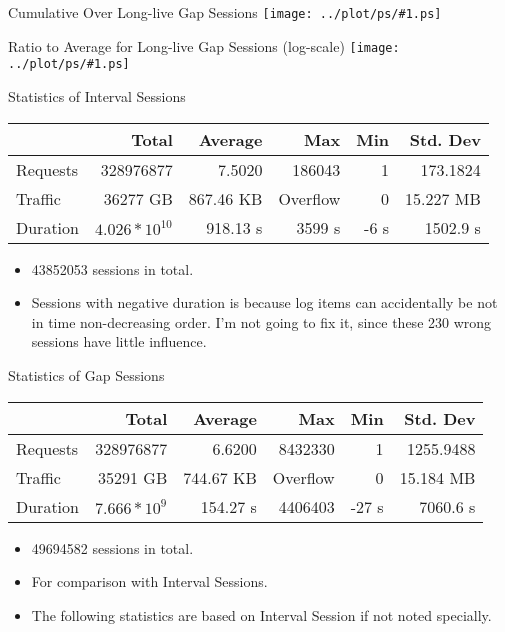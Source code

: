 \documentclass{beamer}
\newcommand\graph[1]{{\texttt{[image: ../plot/ps/\#1.ps]}}}
\begin{document}
\begin{frame}{Cumulative Over Long-live Gap Sessions}
\graph{session-longlive}
\end{frame}

\begin{frame}{Ratio to Average for Long-live Gap Sessions (log-scale)}
\graph{session-longlive-avg}
\end{frame}

\begin{frame}{Statistics of Interval Sessions}
\begin{tabular}[t]{|l|r|r|r|r|r|}
\hline
 & Total & Average & Max & Min & Std. Dev \\
\hline
Requests & 328976877 & 7.5020 & 186043 & 1 & 173.1824 \\
Traffic & 36277 GB & 867.46 KB & Overflow & 0 & 15.227 MB \\
Duration & $4.026 * 10^{10}$ & 918.13 s & 3599 s & -6 s & 1502.9 s \\
\hline
\end{tabular}
\begin{itemize}
  \item 43852053 sessions in total.
  \item Sessions with negative duration is because log items can accidentally be not in time non-decreasing order. I'm not going to fix it, since these 230 wrong sessions have little influence.
\end{itemize}
\end{frame}

\begin{frame}{Statistics of Gap Sessions}
\begin{tabular}[t]{|l|r|r|r|r|r|}
\hline
 & Total & Average & Max & Min & Std. Dev \\
\hline
Requests & 328976877 & 6.6200 & 8432330 & 1 & 1255.9488 \\
Traffic & 35291 GB & 744.67 KB & Overflow & 0 & 15.184 MB \\
Duration & $7.666 * 10^{9}$ & 154.27 s & 4406403 & -27 s & 7060.6 s \\
\hline
\end{tabular}
\begin{itemize}
  \item 49694582 sessions in total.
  \item For comparison with Interval Sessions.
  \item The following statistics are based on Interval Session if not noted specially.
\end{itemize}
\end{frame}
\end{document}
